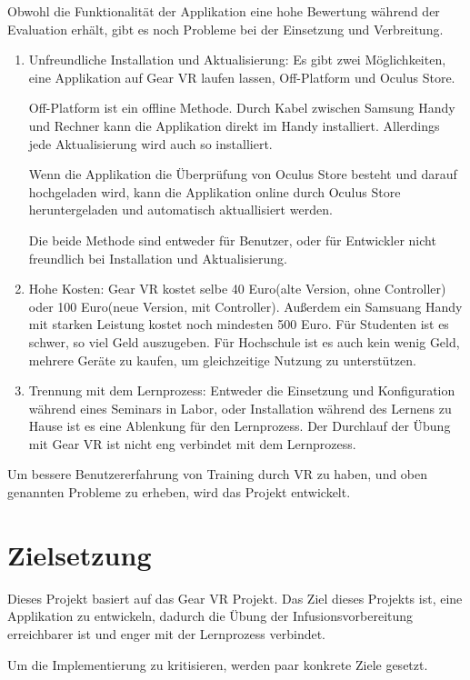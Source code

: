 Obwohl die Funktionalität der Applikation eine hohe Bewertung während der Evaluation erhält, gibt es noch Probleme bei der Einsetzung und Verbreitung.
\begin{enumerate}
\item Unfreundliche Installation und Aktualisierung: Es gibt zwei Möglichkeiten, eine Applikation auf Gear VR laufen lassen, Off-Platform und Oculus Store.

Off-Platform ist ein offline Methode. Durch Kabel zwischen Samsung Handy und Rechner kann die Applikation direkt im Handy installiert. Allerdings jede Aktualisierung wird auch so installiert.

Wenn die Applikation die Überprüfung von Oculus Store besteht und darauf hochgeladen wird, kann die Applikation online durch Oculus Store heruntergeladen und automatisch aktuallisiert werden.

Die beide Methode sind entweder für Benutzer, oder für Entwickler nicht freundlich bei Installation und Aktualisierung.

\item Hohe Kosten: Gear VR kostet selbe 40 Euro(alte Version, ohne Controller) oder 100 Euro(neue Version, mit Controller). Außerdem ein Samsuang Handy mit starken Leistung kostet noch mindesten 500 Euro. Für Studenten ist es schwer, so viel Geld auszugeben. Für Hochschule ist es auch kein wenig Geld, mehrere Geräte zu kaufen, um gleichzeitige Nutzung zu unterstützen.

\item Trennung mit dem Lernprozess: Entweder die Einsetzung und Konfiguration während eines Seminars in Labor, oder Installation während des Lernens zu Hause ist es eine Ablenkung für den Lernprozess. Der Durchlauf der Übung mit Gear VR ist nicht eng verbindet mit dem Lernprozess.
\end{enumerate}

Um bessere Benutzererfahrung von Training durch VR zu haben, und oben genannten Probleme zu erheben, wird das Projekt entwickelt.

\section{Zielsetzung}

Dieses Projekt basiert auf das Gear VR Projekt. Das Ziel dieses Projekts ist, eine Applikation zu entwickeln, dadurch die Übung der Infusionsvorbereitung erreichbarer ist und enger mit der Lernprozess verbindet.

Um die Implementierung zu kritisieren, werden paar konkrete Ziele gesetzt.

